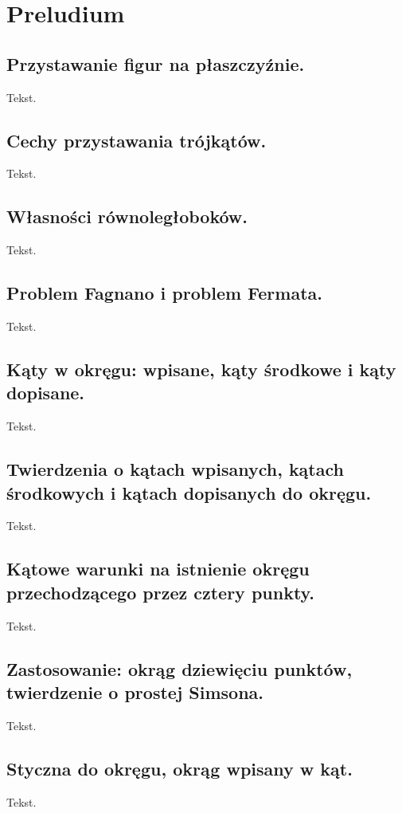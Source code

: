 \documentclass{parchment}
\begin{document}


\chapter{Preludium}

\section{Przystawanie figur na płaszczyźnie.}
Tekst.

\section{Cechy przystawania trójkątów.}
Tekst.

\section{Własności równoległoboków.}
Tekst.

\section{Problem Fagnano i problem Fermata.}
Tekst.

\section{Kąty w okręgu: wpisane, kąty środkowe i kąty dopisane.}
Tekst.

\section{Twierdzenia o kątach wpisanych, kątach środkowych i kątach dopisanych do okręgu.}
Tekst.

\section{Kątowe warunki na istnienie okręgu przechodzącego przez cztery punkty.}
Tekst.

\section{Zastosowanie: okrąg dziewięciu punktów, twierdzenie o prostej Simsona.}
Tekst.

\section{Styczna do okręgu, okrąg wpisany w kąt.}
Tekst.
\end{document}
